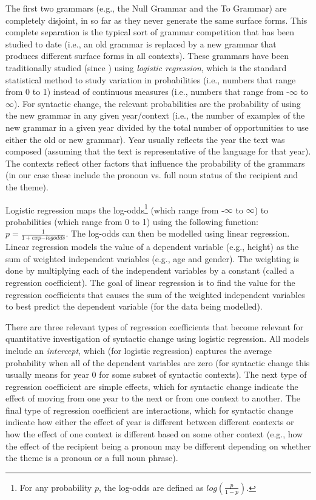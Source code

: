 	The first two grammars (e.g., the Null Grammar and the To Grammar) are completely disjoint, in so far as they never generate the same surface forms. This complete separation is the typical sort of grammar competition that has been studied to date (i.e., an old grammar is replaced by a new grammar that produces different surface forms in all contexts). These grammars have been traditionally studied (since \citealt{Kroch.1989}) using \textit{logistic regression}, which is the standard statistical method to study variation in probabilities (i.e., numbers that range from 0 to 1) instead of continuous measures (i.e., numbers that range from -$\infty$ to $\infty$). For syntactic change, the relevant probabilities are the probability of using the new grammar in any given year/context (i.e., the number of examples of the new grammar in a given year divided by the total number of opportunities to use either the old or new grammar). Year usually reflects the year the text was composed (assuming that the text is representative of the language for that year). The contexts reflect other factors that influence the probability of the grammars (in our case these include the pronoun vs. full noun status of the recipient and the theme).

	Logistic regression maps the log-odds\footnote{For any probability $p$, the log-odds are defined as $log(\frac{p}{1-p})$.} (which range from -$\infty$ to $\infty$) to probabilities (which range from 0 to 1) using the following function: $p=\frac{1}{1+exp{-logodds}}$. The log-odds can then be modelled using linear regression. Linear regression models the value of a dependent variable (e.g., height) as the sum of weighted independent variables (e.g., age and gender). The weighting is done by multiplying each of the independent variables by a constant (called a regression coefficient). The goal of linear regression is to find the value for the regression coefficients that causes the sum of the weighted independent variables to best predict the dependent variable (for the data being modelled).

	There are three relevant types of regression coefficients that become relevant for quantitative investigation of syntactic change using logistic regression. All models include an \textit{intercept}, which (for logistic regression) captures the average probability when all of the dependent variables are zero (for syntactic change this usually means for year 0 for some subset of syntactic contexts). The next type of regression coefficient are simple effects, which for syntactic change indicate the effect of moving from one year to the next or from one context to another. The final type of regression coefficient are interactions, which for syntactic change indicate how either the effect of year is different between different contexts or how the effect of one context is different based on some other context (e.g., how the effect of the recipient being a pronoun may be different depending on whether the theme is a pronoun or a full noun phrase).

